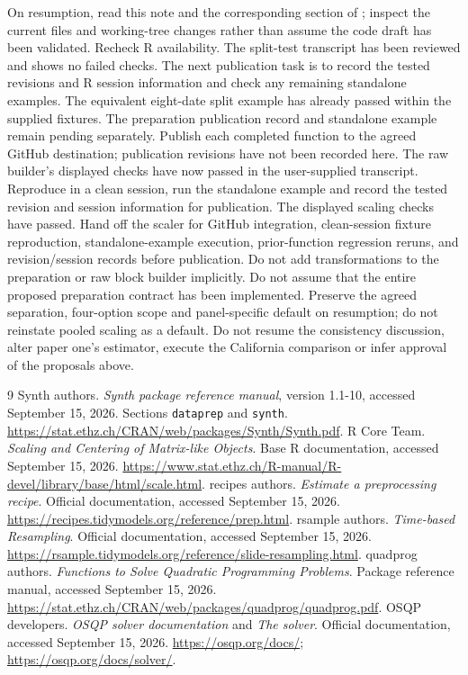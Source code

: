 \documentclass[11pt]{article}
\begin{document}
On resumption, read this note and the corresponding section of
; inspect the current files and working-tree
changes rather than assume the code draft has been validated. Recheck R availability.
The split-test transcript has been reviewed and shows no failed checks.
The next publication task is to record the tested revisions and R session
information and check any remaining standalone examples. The equivalent
eight-date split example has already passed within the supplied fixtures.
The preparation publication record and standalone example remain pending
separately. Publish each completed
function to the agreed GitHub destination; publication revisions have not
been recorded here. The raw builder's displayed checks have now passed in
the user-supplied transcript. Reproduce  in a
clean session, run the standalone example and record the tested revision
and session information for publication. The displayed scaling checks have
passed. Hand off the scaler for GitHub integration, clean-session fixture
reproduction, standalone-example execution, prior-function regression
reruns, and revision/session records before publication. Do not add
transformations to the preparation or raw block builder implicitly.
Do not assume that the entire proposed
preparation contract has been implemented. Preserve the agreed separation,
four-option scope and panel-specific default on resumption; do not reinstate
pooled scaling as a default. Do not
resume the consistency discussion, alter paper one's estimator, execute
the California comparison or infer approval of the proposals above.

\begin{thebibliography}{9}
Synth authors. \emph{Synth package reference manual}, version 1.1-10,
accessed September 15, 2026. Sections \texttt{dataprep} and \texttt{synth}.
\url{https://stat.ethz.ch/CRAN/web/packages/Synth/Synth.pdf}.
R Core Team. \emph{Scaling and Centering of Matrix-like Objects}.
Base R documentation, accessed September 15, 2026.
\url{https://www.stat.ethz.ch/R-manual/R-devel/library/base/html/scale.html}.
recipes authors. \emph{Estimate a preprocessing recipe}.
Official documentation, accessed September 15, 2026.
\url{https://recipes.tidymodels.org/reference/prep.html}.
rsample authors. \emph{Time-based Resampling}.
Official documentation, accessed September 15, 2026.
\url{https://rsample.tidymodels.org/reference/slide-resampling.html}.
quadprog authors. \emph{Functions to Solve Quadratic Programming Problems}.
Package reference manual, accessed September 15, 2026.
\url{https://stat.ethz.ch/CRAN/web/packages/quadprog/quadprog.pdf}.
OSQP developers. \emph{OSQP solver documentation} and \emph{The solver}.
Official documentation, accessed September 15, 2026.
\url{https://osqp.org/docs/}; \url{https://osqp.org/docs/solver/}.
\end{thebibliography}
\end{document}
